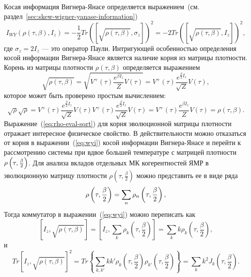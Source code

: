 Косая информация Вигнера-Янасе определяется выражением~(см. раздел~\ref{sec:skew-wigner-yanase-information})
%
\begin{equation}\label{eq:wyi}
  I_{WY}(\rho(\tau,\beta),I_z)
  = -\frac{1}{2} Tr([\sqrt{\rho(\tau,\beta)},\sigma_z])^2
  = -2 Tr([\sqrt{\rho(\tau,\beta)},I_z])^2,
\end{equation}
%
где $\sigma_z=2I_z$ --- это оператор Паули.
Интригующей особенностью определения косой информации Вигнера-Янасе
является наличие корня из матрицы плотности.
Корень из матрицы плотности $\rho(\tau,\beta)$ определяется выражением
%
\begin{equation}\label{eq:rho-eval-sqrt}
  \sqrt{\rho(\tau,\beta)}
  = \sqrt{V^+(\tau)\frac{e^{\beta I_z}}{Z}V(\tau)}
  = V^+(\tau) \frac{e^{\frac{\beta}{2}I_z}}{\sqrt{Z}}V(\tau),
\end{equation}
которое может быть проверено простым вычислением:
\begin{equation}\label{eq:18}
   \sqrt{\rho}\sqrt{\rho}
   = V^+(\tau)\frac{e^{\frac{\beta}{2}I_z}}{\sqrt{Z}}
     V(\tau)V^+(\tau)\frac{e^{\frac{\beta}{2}I_z}}{\sqrt{Z}}V(\tau)
   = V^+(\tau)\frac{e^{\beta I_z}}{Z}V(\tau)
   = \rho(\tau,\beta).
\end{equation}
%
Выражение~(\ref{eq:rho-eval-sqrt}) для корня эволюционной матрицы плотности отражает интересное физическое свойство.
В действительности можно отказаться от корня
в выражении~(\ref{eq:wyi}) косой информации Вигнера-Янасе
и перейти к рассмотрению системы при вдвое большей температуре
с матрицей плотности $\rho\left( \tau,\frac \beta 2 \right)$.
Для анализа вкладов отдельных МК когерентностей ЯМР в эволюционную матрицу плотности
$\rho(\tau,\frac \beta 2)$ можно представить ее в виде ряда~\cite{Feldman1996}
%
\begin{equation}\label{eq:}
  \rho\left( \tau,\frac \beta 2 \right) = \sum_n \rho_{n}\left( \tau,\frac \beta 2 \right),
\end{equation}
%
Тогда коммутатор в выражении~(\ref{eq:wyi}) можно переписать как
%
\begin{equation} \label{eq:19}
    \left[I_z,\sqrt{\rho(\tau,\beta)}\right]
    = \left[I_z, \sum_k \rho_k \left(\tau, \frac{\beta}{2}\right)\right]
    = \sum_k k\rho_k \left(\tau, \frac{\beta}{2}\right),
\end{equation}
%
и
%
\begin{equation} \label{eq:20}
	Tr\left[I_z,\sqrt{\rho(\tau,\beta)} \right]^2
	= Tr\left\{\sum_{k,k'}kk'
		\rho_k\left(\tau,\frac{\beta}{2}\right)
		\rho_{k'}\left(\tau,\frac{\beta}{2}\right)
	\right\}
	= \sum_k k^2 J_k\left(\tau,\frac{\beta}{2}\right).
\end{equation}
